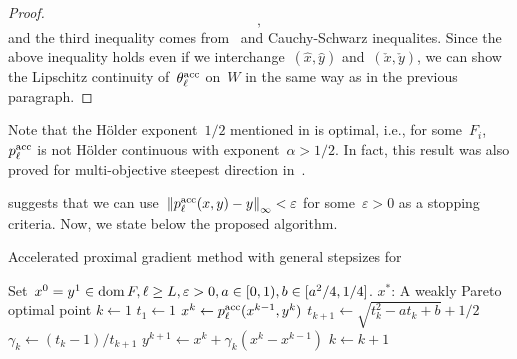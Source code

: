 \documentclass[../main]{subfiles}
\begin{document}
\begin{proof}
\begin{equation}
   ,\end{equation} and the third inequality comes from~ and Cauchy-Schwarz inequalites.
   Since the above inequality holds even if we interchange~$(\hat{x}, \hat{y})$ and~$(\check{x}, \check{y})$, we can show the Lipschitz continuity of~$\theta^\acc_\ell$ on~$W$ in the same way as in the previous paragraph.
     \end{proof}
     Note that the H\"{o}lder exponent~$1 / 2$ mentioned in  is optimal, i.e., for some~$F_i$,~$p^\acc_\ell$ is not H\"{o}lder continuous with exponent~$\alpha > 1 / 2$.
     In fact, this result was also proved for multi-objective steepest direction in~\cite{Svaiter2018}.

      suggests that we can use~$\norm*{p^\acc_\ell(x, y) - y}_\infty < \varepsilon$ for some~$\varepsilon > 0$ as a stopping criteria.
Now, we state below the proposed algorithm.

\begin{algorithm}[hbtp]
    \caption{Accelerated proximal gradient method with general stepsizes for~}
    \begin{algorithmic}[1]
        \Require Set~$x^0 = y^1 \in \dom F, \ell \ge L, \varepsilon > 0, a \in [0, 1), b \in [a^2 / 4, 1 / 4]$.
        \Ensure $x^\ast$: A weakly Pareto optimal point
        \State $k \gets 1$
        \State $t_1 \gets 1$ 
        \State $x^k \gets p^\acc_\ell(x^{k - 1}, y^k)$
        \State $t_{k + 1} \gets \sqrt{t_k^2 - a t_k + b} + 1/2$ 
        \State $\gamma_k \gets (t_k - 1) / t_{k + 1}$ 
        \State $y^{k + 1} \gets x^k + \gamma_k (x^k - x^{k - 1})$ 
        \State $k \gets k + 1$
        \EndWhile
    \end{algorithmic}
\end{algorithm}
\end{document}
